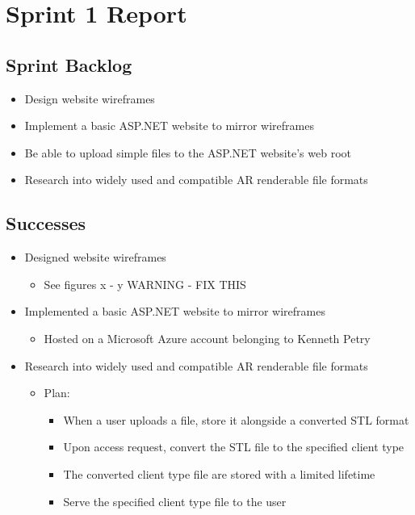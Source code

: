 
\section{Sprint 1 Report}
\label{sec:Sprint1_report}
    \subsection{Sprint Backlog}
    \label{sec:Sprint1_backlog}
    \begin{itemize}
        \item Design website wireframes 
        \item Implement a basic ASP.NET website to mirror wireframes
        \item Be able to upload simple files to the ASP.NET website's web root
        \item Research into widely used and compatible AR renderable file formats
    \end{itemize}

    \subsection{Successes}
    \label{sec:Sprint1_successes}
        \begin{itemize}
            \item Designed website wireframes
                \begin{itemize}
                    \item See figures x - y WARNING - FIX THIS %
                \end{itemize}
            \item Implemented a basic ASP.NET website to mirror wireframes
                \begin{itemize}
                    \item Hosted on a Microsoft Azure account belonging to Kenneth Petry
                \end{itemize}
            \item Research into widely used and compatible AR renderable file formats
                \begin{itemize}
                    \item Plan:
                        \begin{itemize}
                            \item When a user uploads a file, store it alongside a converted STL format
                            \item Upon access request, convert the STL file to the specified client type
                            \item The converted client type file are stored with a limited lifetime
                            \item Serve the specified client type file to the user
                        \end{itemize}
                \end{itemize}
        \end{itemize}
